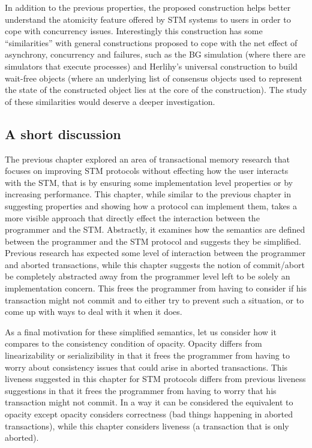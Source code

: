 In addition to the previous properties, 
the proposed  construction helps better understand the atomicity feature  
offered  by STM systems to users in order to cope with concurrency issues. 
Interestingly this construction has some ``similarities'' with 
general constructions proposed to cope with the net effect of 
asynchrony, concurrency and failures, such as 
the BG simulation \cite{BG93}  (where there are simulators that execute 
processes) and   Herlihy's universal construction to  build  wait-free 
objects \cite{H91} (where an underlying list of consensus objects 
used to represent the state of the constructed object lies at the 
core of the construction). The study of these  similarities would 
deserve a  deeper investigation.

\subsection{A short discussion}
The previous chapter explored an area of transactional memory
research that focuses on improving STM protocols without effecting
how the user interacts with the STM, that is by ensuring some implementation
level properties or by increasing performance.
This chapter, while similar to the previous chapter in suggesting properties
and showing how a protocol can implement them,
takes a more visible approach
that directly effect the interaction between the programmer and
the STM.
Abstractly, it examines how the semantics are defined between
the programmer and the STM protocol and suggests they be simplified.
Previous research has expected some level of interaction
between the programmer and aborted transactions, while this
chapter suggests the notion of commit/abort be completely abstracted
away from the programmer level left to be solely an implementation
concern.
This frees the programmer from having to consider if his transaction
might not commit and to either try to prevent such a situation, or to 
come up with ways to deal with it when it does.

As a final motivation for these simplified semantics, let us consider how it compares
to the consistency condition of opacity.
Opacity differs from linearizability or serializibility in that
it frees the programmer from having to worry about consistency
issues that could arise in aborted transactions.
This liveness suggested in this chapter for STM protocols differs
from previous liveness suggestions in that it frees the programmer from
having to worry that his transaction might not commit.
In a way it can be considered the equivalent to opacity except
opacity considers correctness (bad things happening in aborted transactions),
while this chapter considers liveness (a transaction that is only aborted).

